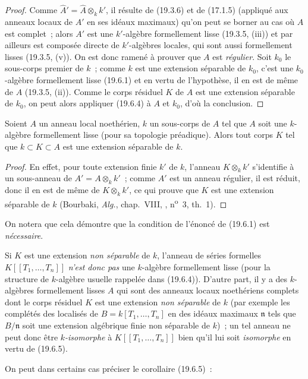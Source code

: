 \begin{proof}
Comme $\widehat A'=\widehat A\otimes_k k'$, il résulte de (19.3.6) et de
(17.1.5) (appliqué aux anneaux locaux de $A'$ en ses idéaux maximaux) qu'on
peut se borner au cas où $A$ est complet~; alors $A'$ est une $k'$-algèbre
formellement lisse (19.3.5, (iii)) et par ailleurs est composée directe de
$k'$-algèbres locales, qui sont aussi formellement lisses (19.3.5, (v)). On est
donc ramené à prouver que $A$ est \emph{régulier}. Soit $k_0$ le sous-corps
premier de $k$~; comme $k$ est une extension séparable de $k_0$, c'est une
$k_0$-algèbre formellement lisse (19.6.1) et en vertu de l'hypothèse, il en est
de même de $A$ (19.3.5, (ii)). Comme le corps résiduel $K$ de $A$ est une
extension séparable de $k_0$, on peut alors appliquer (19.6.4) à $A$ et $k_0$,
d'où la conclusion.
\end{proof}


\begin{corollary}[19.6.5.1]
\label{0.19.6.5.1-fr}
Soient $A$ un anneau local noethérien, $k$ un sous-corps de $A$ tel que $A$
soit une $k$-algèbre formellement lisse (pour sa topologie préadique). Alors
tout corps $K$ tel que $k\subset K\subset A$ est une extension séparable de
$k$.
\end{corollary}

\begin{proof}
En effet, pour toute extension finie $k'$ de $k$, l'anneau $K\otimes_k k'$ 
s'identifie à un sous-anneau de $A'=A\otimes_k k'$~; comme $A'$ est un anneau
régulier, il est réduit, donc il en est de même de $K\otimes_k k'$, ce qui prouve que $K$
est une extension séparable de $k$ (Bourbaki, \emph{Alg.}, chap.~VIII,
, n\textsuperscript{o}~3, th.~1).
\end{proof}

On notera que cela démontre que la condition de l'énoncé de (19.6.1) est
\emph{nécessaire}.

\begin{remark}[19.6.5.2]
\label{0.19.6.5.2-fr}
Si $K$ est une extension \emph{non séparable} de $k$, l'anneau de séries
formelles $K[[T_1,\ldots,T_n]]$ \emph{n'est donc pas} une $k$-algèbre
formellement lisse (pour la structure de $k$-algèbre usuelle rappelée dans
(19.6.4)). D'autre part, il y a des $k$-algèbres formellement lisses $A$ qui
sont des anneaux locaux noethériens complets dont le corps résiduel $K$ est une
extension \emph{non séparable} de $k$ (par exemple les complétés des localisés
de $B=k[T_1,\ldots,T_n]$ en des idéaux maximaux $\mathfrak n$ tels que
$B/\mathfrak n$ soit une extension algébrique finie non séparable de $k$)~; un
tel anneau ne peut donc être \emph{$k$-isomorphe} à $K[[T_1,\ldots,T_n]]$ bien qu'il
lui soit \emph{isomorphe} en vertu de (19.6.5).

On peut dans certains cas préciser le corollaire (19.6.5)~:
\end{remark}

